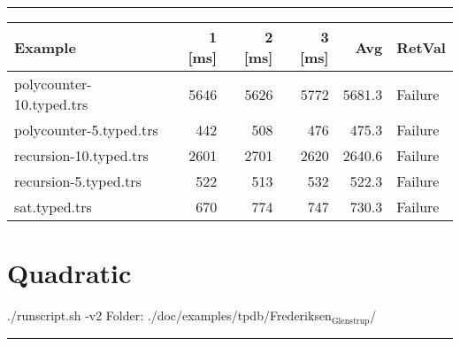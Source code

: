\documentclass[11pt]{article}
\begin{document}
\rule{\linewidth}{0.5pt}

\begin{center}
\begin{tabular}{lrrrrl}
Example & 1 [ms] & 2 [ms] & 3 [ms] & Avg & RetVal\\
\hline
polycounter-10.typed.trs & 5646 & 5626 & 5772 & 5681.3 & Failure\\
polycounter-5.typed.trs & 442 & 508 & 476 & 475.3 & Failure\\
recursion-10.typed.trs & 2601 & 2701 & 2620 & 2640.6 & Failure\\
recursion-5.typed.trs & 522 & 513 & 532 & 522.3 & Failure\\
sat.typed.trs & 670 & 774 & 747 & 730.3 & Failure\\
\end{tabular}

\end{center}


\section{Quadratic}
\label{sec:org26cccfe}

./runscript.sh -v2
Folder: ./doc/examples/tpdb/Frederiksen\(_{\text{Glenstrup}}\)/

\rule{\linewidth}{0.5pt}
\end{document}
